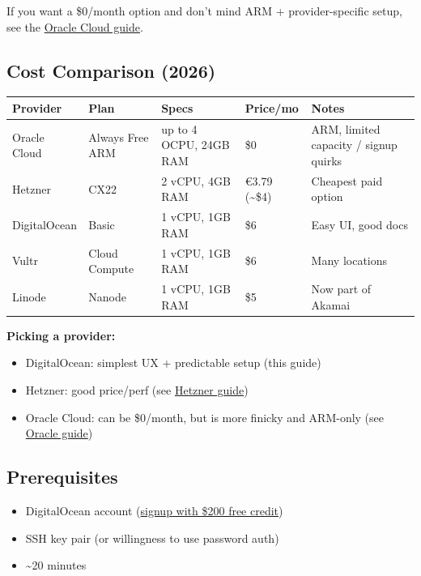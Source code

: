 If you want a \$0/month option and don’t mind ARM + provider-specific setup, see the \href{/platforms/oracle}{Oracle Cloud guide}.

\subsection{Cost Comparison (2026)}



\begin{table}[h]
\centering
\small
\begin{tabular}{|l|l|l|l|l|}
\hline
Provider & Plan & Specs & Price/mo & Notes \\
\hline
Oracle Cloud & Always Free ARM & up to 4 OCPU, 24GB RAM & \$0 & ARM, limited capacity / signup quirks \\
\hline
Hetzner & CX22 & 2 vCPU, 4GB RAM & €3.79 (\textasciitilde{}\$4) & Cheapest paid option \\
\hline
DigitalOcean & Basic & 1 vCPU, 1GB RAM & \$6 & Easy UI, good docs \\
\hline
Vultr & Cloud Compute & 1 vCPU, 1GB RAM & \$6 & Many locations \\
\hline
Linode & Nanode & 1 vCPU, 1GB RAM & \$5 & Now part of Akamai \\
\hline
\end{tabular}
\end{table}



\textbf{Picking a provider:}

\begin{itemize}
  \item DigitalOcean: simplest UX + predictable setup (this guide)
  \item Hetzner: good price/perf (see \href{/install/hetzner}{Hetzner guide})
  \item Oracle Cloud: can be \$0/month, but is more finicky and ARM-only (see \href{/platforms/oracle}{Oracle guide})
\end{itemize}


\hrulefill


\subsection{Prerequisites}


\begin{itemize}
  \item DigitalOcean account (\href{https://m.do.co/c/signup}{signup with \$200 free credit})
  \item SSH key pair (or willingness to use password auth)
  \item \textasciitilde{}20 minutes
\end{itemize}


